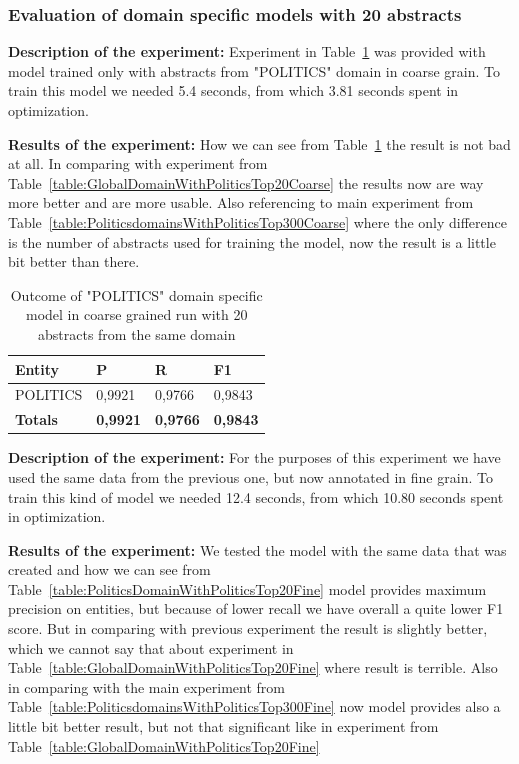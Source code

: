 \documentclass[thesis=M,english]{FITthesis}[2018/05/30]
\begin{document}

\subsubsection{Evaluation of domain specific models with 20 abstracts}

\textbf{Description of the experiment:} Experiment in Table~\ref{table:PoliticsDomainWithPoliticsTop20Coarse} was provided with model trained only with abstracts from "POLITICS" domain in coarse grain. To train this model we needed 5.4 seconds, from which 3.81 seconds spent in optimization.

\textbf{Results of the experiment:} How we can see from Table~\ref{table:PoliticsDomainWithPoliticsTop20Coarse} the result is not bad at all. In comparing with experiment from Table~\ref{table:GlobalDomainWithPoliticsTop20Coarse} the results now are way more better and are more usable. Also referencing to main experiment from Table~\ref{table:PoliticsdomainsWithPoliticsTop300Coarse} where the only difference is the number of abstracts used for training the model, now the result is a little bit better than there.  
	
	\begin{table}[H]\centering
		\begin{tabular}{|l|l|l|l|}
			\hline {\textbf{Entity}} & {\textbf{P}} & {\textbf{R}} & {\textbf{F1}}\\\hline
				POLITICS & 0,9921 & 0,9766 & 0,9843\\\hline
				\textbf{Totals} & \textbf{0,9921} & \textbf{0,9766} & \textbf{0,9843}\\\hline
		\end{tabular}
		\caption{Outcome of "POLITICS" domain specific model in coarse grained run with 20 abstracts from the same domain \label{table:PoliticsDomainWithPoliticsTop20Coarse}}		
	\end{table}	
	
\textbf{Description of the experiment:} For the purposes of this experiment we have used the same data from the previous one, but now annotated in fine grain. To train this kind of model we needed 12.4 seconds, from which 10.80 seconds spent in optimization.  

\textbf{Results of the experiment:} We tested the model with the same data that was created and how we can see from Table~\ref{table:PoliticsDomainWithPoliticsTop20Fine} model provides maximum precision on entities, but because of lower recall we have overall a quite lower F1 score. But in comparing with previous experiment the result is slightly better, which we cannot say that about experiment in Table~\ref{table:GlobalDomainWithPoliticsTop20Fine} where result is terrible. Also in comparing with the main experiment from Table~\ref{table:PoliticsdomainsWithPoliticsTop300Fine} now model provides also a little bit better result, but not that significant like in experiment from Table~\ref{table:GlobalDomainWithPoliticsTop20Fine} 
	
\end{document}
